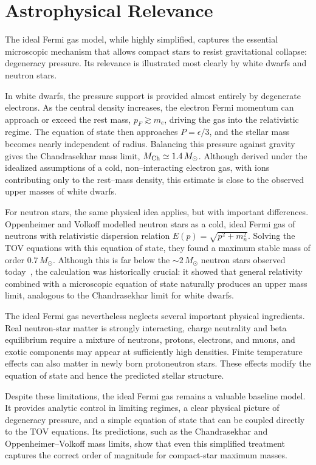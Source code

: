 \section{Astrophysical Relevance}

The ideal Fermi gas model, while highly simplified, captures the essential
microscopic mechanism that allows compact stars to resist gravitational
collapse: degeneracy pressure. Its relevance is illustrated most clearly by
white dwarfs and neutron stars.

In white dwarfs, the pressure support is provided almost entirely by degenerate
electrons. As the central density increases, the electron Fermi momentum can
approach or exceed the rest mass, \(p_F \gtrsim m_e\), driving the gas into the
relativistic regime. The equation of state then approaches \(P=\epsilon/3\),
and the stellar mass becomes nearly independent of radius. Balancing this
pressure against gravity gives the Chandrasekhar mass limit,
\(M_{\rm Ch} \simeq 1.4\,M_\odot\). Although derived under the idealized
assumptions of a cold, non--interacting electron gas, with ions contributing
only to the rest--mass density, this estimate is close to the observed upper
masses of white dwarfs.

For neutron stars, the same physical idea applies, but with important
differences. Oppenheimer and Volkoff modelled neutron stars as a cold, ideal
Fermi gas of neutrons with relativistic dispersion relation
\(E(p)=\sqrt{p^2+m_n^2}\). Solving the TOV equations with this equation of
state, they found a maximum stable mass of order \(0.7\,M_\odot\). Although
this is far below the \(\sim 2\,M_\odot\) neutron stars observed
today~\cite{haensel2007}, the calculation was historically crucial: it showed
that general relativity combined with a microscopic equation of state naturally
produces an upper mass limit, analogous to the Chandrasekhar limit for white
dwarfs.

The ideal Fermi gas nevertheless neglects several important physical
ingredients. Real neutron-star matter is strongly interacting, charge neutrality
and beta equilibrium require a mixture of neutrons, protons, electrons, and
muons, and exotic components may appear at sufficiently high densities. Finite
temperature effects can also matter in newly born protoneutron stars. These
effects modify the equation of state and hence the predicted stellar structure.

Despite these limitations, the ideal Fermi gas remains a valuable baseline
model. It provides analytic control in limiting regimes, a clear physical
picture of degeneracy pressure, and a simple equation of state that can be
coupled directly to the TOV equations. Its predictions, such as the
Chandrasekhar and Oppenheimer--Volkoff mass limits, show that even this
simplified treatment captures the correct order of magnitude for compact-star
maximum masses.
